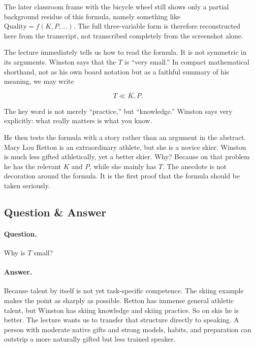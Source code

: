\begin{remark}
The later classroom frame with the bicycle wheel still shows only a partial background residue of this formula, namely something like \(\text{Quality}=f(K,P,\ldots)\). The full three-variable form is therefore reconstructed here from the transcript, not transcribed completely from the screenshot alone.
\end{remark}

The lecture immediately tells us how to read the formula. It is not symmetric in its arguments. Winston says that the \(T\) is ``very small.'' In compact mathematical shorthand, not as his own board notation but as a faithful summary of his meaning, we may write

\begin{equation}
T \ll K,P.
\end{equation}

The key word is not merely ``practice,'' but ``knowledge.'' Winston says very explicitly: what really matters is what you know.

He then tests the formula with a story rather than an argument in the abstract. Mary Lou Retton is an extraordinary athlete, but she is a novice skier. Winston is much less gifted athletically, yet a better skier. Why? Because on that problem he has the relevant \(K\) and \(P\), while she mainly has \(T\). The anecdote is not decoration around the formula. It is the first proof that the formula should be taken seriously.

\subsection{Question \& Answer}

\paragraph{Question.} Why is \(T\) small?

\paragraph{Answer.} Because talent by itself is not yet task-specific competence. The skiing example makes the point as sharply as possible. Retton has immense general athletic talent, but Winston has skiing knowledge and skiing practice. So on skis he is better. The lecture wants us to transfer that structure directly to speaking. A person with moderate native gifts and strong models, habits, and preparation can outstrip a more naturally gifted but less trained speaker.

